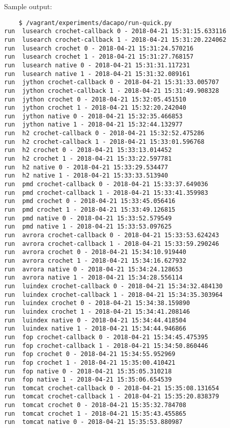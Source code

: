 \documentclass[12pt]{article}
\begin{document}
\begin{description}
Sample output:
\begin{verbatim}
	$ /vagrant/experiments/dacapo/run-quick.py 
run  lusearch crochet-callback 0 - 2018-04-21 15:31:15.633116
run  lusearch crochet-callback 1 - 2018-04-21 15:31:20.224062
run  lusearch crochet 0 - 2018-04-21 15:31:24.570216
run  lusearch crochet 1 - 2018-04-21 15:31:27.768157
run  lusearch native 0 - 2018-04-21 15:31:31.117231
run  lusearch native 1 - 2018-04-21 15:31:32.089161
run  jython crochet-callback 0 - 2018-04-21 15:31:33.005707
run  jython crochet-callback 1 - 2018-04-21 15:31:49.908328
run  jython crochet 0 - 2018-04-21 15:32:05.451510
run  jython crochet 1 - 2018-04-21 15:32:20.242040
run  jython native 0 - 2018-04-21 15:32:35.466853
run  jython native 1 - 2018-04-21 15:32:44.132977
run  h2 crochet-callback 0 - 2018-04-21 15:32:52.475286
run  h2 crochet-callback 1 - 2018-04-21 15:33:01.596768
run  h2 crochet 0 - 2018-04-21 15:33:13.014452
run  h2 crochet 1 - 2018-04-21 15:33:22.597781
run  h2 native 0 - 2018-04-21 15:33:29.534477
run  h2 native 1 - 2018-04-21 15:33:33.513940
run  pmd crochet-callback 0 - 2018-04-21 15:33:37.649036
run  pmd crochet-callback 1 - 2018-04-21 15:33:41.359983
run  pmd crochet 0 - 2018-04-21 15:33:45.056416
run  pmd crochet 1 - 2018-04-21 15:33:49.126815
run  pmd native 0 - 2018-04-21 15:33:52.579549
run  pmd native 1 - 2018-04-21 15:33:53.097625
run  avrora crochet-callback 0 - 2018-04-21 15:33:53.624243
run  avrora crochet-callback 1 - 2018-04-21 15:33:59.290246
run  avrora crochet 0 - 2018-04-21 15:34:10.919440
run  avrora crochet 1 - 2018-04-21 15:34:16.627932
run  avrora native 0 - 2018-04-21 15:34:24.128653
run  avrora native 1 - 2018-04-21 15:34:28.556114
run  luindex crochet-callback 0 - 2018-04-21 15:34:32.484130
run  luindex crochet-callback 1 - 2018-04-21 15:34:35.303964
run  luindex crochet 0 - 2018-04-21 15:34:38.159890
run  luindex crochet 1 - 2018-04-21 15:34:41.208146
run  luindex native 0 - 2018-04-21 15:34:44.418504
run  luindex native 1 - 2018-04-21 15:34:44.946866
run  fop crochet-callback 0 - 2018-04-21 15:34:45.475395
run  fop crochet-callback 1 - 2018-04-21 15:34:50.860446
run  fop crochet 0 - 2018-04-21 15:34:55.952969
run  fop crochet 1 - 2018-04-21 15:35:00.410421
run  fop native 0 - 2018-04-21 15:35:05.310218
run  fop native 1 - 2018-04-21 15:35:06.654539
run  tomcat crochet-callback 0 - 2018-04-21 15:35:08.131654
run  tomcat crochet-callback 1 - 2018-04-21 15:35:20.838379
run  tomcat crochet 0 - 2018-04-21 15:35:32.784708
run  tomcat crochet 1 - 2018-04-21 15:35:43.455865
run  tomcat native 0 - 2018-04-21 15:35:53.880987

\end{verbatim}
\end{description}
\end{document}
